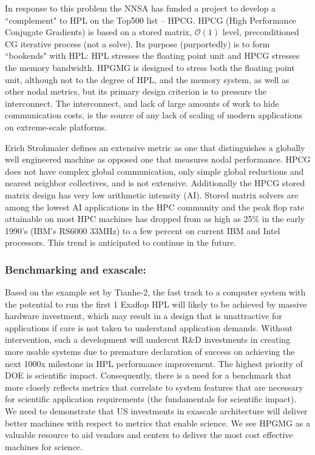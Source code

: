 \documentclass[11pt]{amsart}
\newcommand{\Order}[1]{\ensuremath{\mathcal{O}(#1)}}    %
\begin{document}
In response to this problem the NNSA has funded a project to develop a ``complement" to HPL on the Top500 list -- HPCG.
HPCG (High Performance Conjugate Gradients) is based on a stored matrix, \Order{1} level, preconditioned CG iterative process (not a solve).
Its purpose (purportedly) is to form ``bookends" with HPL: HPL stresses the floating point unit and HPCG stresses the memory bandwidth.
HPGMG is designed to stress both the floating point unit, although not to the degree of HPL, and the memory system, as well as other nodal metrics, but its primary design criterion is to pressure the interconnect.
The interconnect, and lack of large amounts of work to hide communication costs, is the source of any lack of scaling of modern applications on extreme-scale platforms.


Erich Strohmaier defines an extensive metric as one that distinguishes a globally well engineered machine as opposed one that measures nodal performance. 
HPCG does not have complex global communication, only simple global reductions and nearest neighbor collectives, and is not extensive. 
Additionally the HPCG stored matrix design has very low arithmetic intensity (AI). %
Stored matrix solvers are among the lowest AI applications in the HPC community and the peak flop rate attainable on most HPC machines has dropped from as high as 25\% in the early 1990's (IBM's RS6000 33MHz) to a few percent on current IBM and Intel processors.
This trend is anticipated to continue in the future.

\subsubsection*{Benchmarking and exascale:} 

Based on the example set by Tianhe-2, the fast track to a computer system with the potential to run the first 1 Exaflop HPL will likely to be achieved by massive hardware investment, which may result in a design that is unattractive for applications if care is not taken to understand application demands. 
Without intervention, such a development will undercut R\&D investments in creating more usable systems due to premature declaration of success on achieving the next 1000x milestone in HPL performance improvement. 
The highest priority of DOE is scientific impact.
Consequently, there is a need for a benchmark that more closely reflects metrics that correlate to system features that are necessary for scientific application requirements (the fundamentals for scientific impact).
We need to demonstrate that US investments in exascale architecture will deliver better machines with respect to metrics that enable science.
We see HPGMG as a valuable resource to aid vendors and centers to deliver the most cost effective machines for science.
\end{document}
